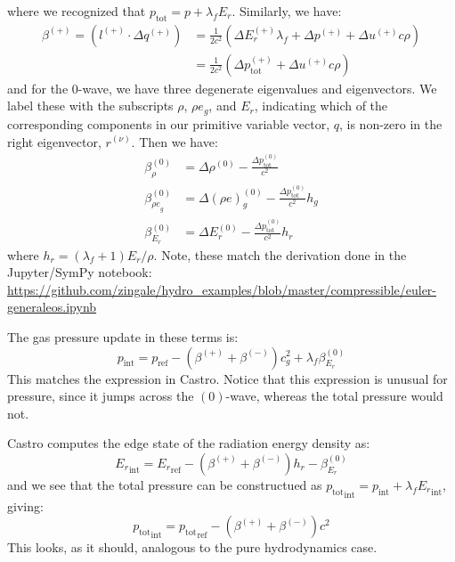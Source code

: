 \documentclass[12pt]{article}
\newcommand{\nup}{{(\nu)}}
\newcommand{\evm}{{(-)}}
\newcommand{\evz}{{(0)}}
\newcommand{\evp}{{(+)}}
\begin{document}
where we recognized that $p_\mathrm{tot} = p + \lambda_f E_r$.
Similarly, we have:
\begin{align}
\beta^\evp = ( l^\evp \cdot \Delta q^\evp ) &= \frac{1}{2 c^{2}} \left(
    \Delta E_r^\evp \lambda_f + \Delta p^\evp + \Delta u^\evp c \rho\right)\\
           &= \frac{1}{2 c^{2}} \left(
    \Delta p_\mathrm{tot}^\evp + \Delta u^\evp c \rho\right)
\end{align}
and for the 0-wave, we have three degenerate eigenvalues and
eigenvectors.  We label these with the subscripts $\rho$, $\rho e_g$,
and $E_r$, indicating which of the corresponding components in our
primitive variable vector, $q$, is non-zero in the right eigenvector,
$r^\nup$.  Then we have:
\begin{align}
\beta^\evz_\rho &= 
    \Delta\rho^\evz  - \frac{\Delta p^\evz_\mathrm{tot}}{c^2} \\
%
\beta^\evz_{{\rho e}_g} &= \Delta(\rho e)^\evz_g - \frac{\Delta p_\mathrm{tot}^\evz}{c^2} h_g \\
%
\beta^\evz_{E_r} &= \Delta E_r^\evz - \frac{\Delta p_\mathrm{tot}^\evz}{c^2} h_r
\end{align}
where $h_r = (\lambda_f + 1)E_r/\rho$.  Note, these match the derivation
done in the Jupyter/SymPy notebook:\newline
{\footnotesize \url{https://github.com/zingale/hydro_examples/blob/master/compressible/euler-generaleos.ipynb}}

The gas pressure update in these terms is:
\begin{equation}
p_\mathrm{int} = p_\mathrm{ref} - (\beta^\evp + \beta^\evm) c_g^2 + \lambda_f \beta^\evz_{E_r}
\end{equation}
This matches the expression in Castro.  Notice that this expression is
unusual for pressure, since it jumps across the $\evz$-wave, whereas
the total pressure would not.  

Castro computes the edge state of the radiation energy density as:
\begin{equation}
{E_r}_\mathrm{int} = {E_r}_\mathrm{ref} - (\beta^\evp + \beta^\evm) h_r - \beta^\evz_{E_r}
\end{equation}
and we see that the total pressure can be constructued as
${p_\mathrm{tot}}_\mathrm{int} = p_\mathrm{int} + \lambda_f
{E_r}_\mathrm{int}$, giving:
\begin{equation}
{p_\mathrm{tot}}_\mathrm{int} = {p_\mathrm{tot}}_\mathrm{ref} -
   (\beta^\evp + \beta^\evm) c^2
\end{equation}
This looks, as it should, analogous to the pure hydrodynamics case.
\end{document}
